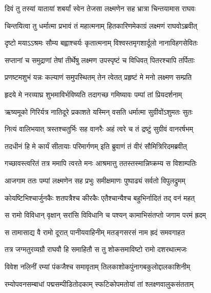 
\twolineshloka
{दिवं तु तस्यां यातायां शबर्यां स्वेन तेजसा}
{लक्ष्मणेन सह भ्रात्रा चिन्तयामास राघवः} %

\twolineshloka
{चिन्तयित्वा तु धर्मात्मा प्रभावं तं महात्मनाम्}
{हितकारिणमेकाग्रं लक्ष्मणं राघवोऽब्रवीत्} %

\twolineshloka
{दृष्टो मयाऽऽश्रमः सौम्य बह्वाश्चर्यः कृतात्मनाम्}
{विश्वस्तमृगशार्दूलो नानाविहगसेवितः} %

\twolineshloka
{सप्तानां च समुद्राणां तेषां तीर्थेषु लक्ष्मण}
{उपस्पृष्टं च विधिवत् पितरश्चापि तर्पिताः} %

\twolineshloka
{प्रणष्टमशुभं यन्नः कल्याणं समुपस्थितम्}
{तेन त्वेतत् प्रहृष्टं मे मनो लक्ष्मण सम्प्रति} %

\twolineshloka
{हृदये मे नरव्याघ्र शुभमाविर्भविष्यति}
{तदागच्छ गमिष्यावः पम्पां तां प्रियदर्शनाम्} %

\twolineshloka
{ऋष्यमूको गिरिर्यत्र नातिदूरे प्रकाशते}
{यस्मिन् वसति धर्मात्मा सुग्रीवोंऽशुमतः सुतः} %

\twolineshloka
{नित्यं वालिभयात् त्रस्तश्चतुर्भिः सह वानरैः}
{अहं त्वरे च तं द्रष्टुं सुग्रीवं वानरर्षभम्} %

\twolineshloka
{तदधीनं हि मे कार्यं सीतायाः परिमार्गणम्}
{इति ब्रुवाणं तं वीरं सौमित्रिरिदमब्रवीत्} %

\twolineshloka
{गच्छावस्त्वरितं तत्र ममापि त्वरते मनः}
{आश्रमात्तु ततस्तस्मान्निष्क्रम्य स विशाम्पतिः} %

\twolineshloka
{आजगाम ततः पम्पां लक्ष्मणेन सह प्रभुः}
{समीक्षमाणः पुष्पाढ्यं सर्वतो विपुलद्रुमम्} %

\twolineshloka
{कोयष्टिभिश्चार्जुनकैः शतपत्रैश्च कीरकैः}
{एतैश्चान्यैश्च बहुभिर्नादितं तद् वनं महत्} %

\twolineshloka
{स रामो विविधान् वृक्षान् सरांसि विविधानि च}
{पश्यन् कामाभिसंतप्तो जगाम परमं ह्रदम्} %

\twolineshloka
{स तामासाद्य वै रामो दूरात् पानीयवाहिनीम्}
{मतङ्गसरसं नाम ह्रदं समवगाहत} %

\twolineshloka
{तत्र जग्मतुरव्यग्रौ राघवौ हि समाहितौ}
{स तु शोकसमाविष्टो रामो दशरथात्मजः} %

\twolineshloka
{विवेश नलिनीं रम्यां पंकजैश्च समावृताम्}
{तिलकाशोकपुंनागबकुलोद्दालकाशिनीम्} %

\twolineshloka
{रम्योपवनसम्बाधां पद्मसम्पीडितोदकाम्}
{स्फटिकोपमतोयां तां श्लक्ष्णवालुकसंतताम्} %

